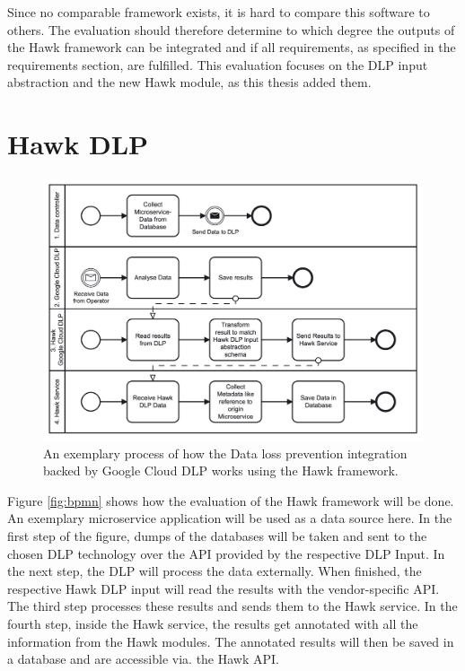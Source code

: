 


\graphicspath{{8/figures/}}

Since no comparable framework exists, it is hard to compare this software to others.
The evaluation should therefore determine to which degree the outputs of the Hawk framework can be integrated and if all requirements, as specified in the requirements section, are fulfilled. This evaluation focuses on the DLP input abstraction and the new Hawk module, as this thesis added them. 

\section{Hawk DLP}
\begin{figure}[!h]
  \centering

  \includegraphics[width=0.95\columnwidth]{bpmn.png}

  \caption[Hawk exemplary DLP process]{An exemplary process of how the Data loss prevention integration backed by Google Cloud DLP works using the Hawk framework.}  
  \label{fig:hawk-dlp-uml}
\end{figure}

Figure \ref{fig:bpmn} shows how the evaluation of the Hawk framework will be done. An exemplary microservice application will be used as a data source here. In the first step of the figure, dumps of the databases will be taken and sent to the chosen DLP technology over the API provided by the respective DLP Input. In the next step, the DLP will process the data externally. When finished, the respective Hawk DLP input will read the results with the vendor-specific API. The third step processes these results and sends them to the Hawk service. In the fourth step, inside the Hawk service, the results get annotated with all the information from the Hawk modules. The annotated results will then be saved in a database and are accessible via. the Hawk API.

